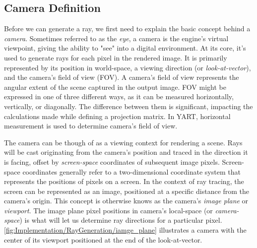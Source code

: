 \subsection{Camera Definition}

Before we can generate a ray, we first need to explain the basic concept behind a \textit{camera}.
Sometimes referred to as the \textit{eye}, a camera is the engine's virtual viewpoint, giving the ability to "see" into a digital environment.
At its core, it's used to generate rays for each pixel in the rendered image.
It is primarily represented by its position in world-space, a viewing direction (or \textit{look-at-vector}), and the camera's field of view (FOV).
A camera's field of view represents the angular extent of the scene captured in the output image. 
FOV might be expressed in one of three different ways, as it can be measured horizontally, vertically, or diagonally.
The difference between them is significant, impacting the calculations made while defining a projection matrix.
In YART, horizontal measurement is used to determine camera's field of view.

The camera can be though of as a viewing context for rendering a scene.
Rays will be cast originating from the camera's position and traced in the direction it is facing, offset by \textit{screen-space} coordinates of subsequent image pixels.
Screen-space coordinates generally refer to a two-dimensional coordinate system that represents the positions of pixels on a screen.
In the context of ray tracing, the screen can be represented as an image, positioned at a specific distance from the camera's origin. 
This concept is otherwise knows as the camera's \textit{image plane} or \textit{viewport}.
The image plane pixel positions in camera's local-space (or \textit{camera-space}) is what will let us determine ray directions for a particular pixel. 
\cref{fig:Implementation/RayGeneration/iamge_plane} illustrates a camera with the center of its viewport positioned at the end of the look-at-vector.  

